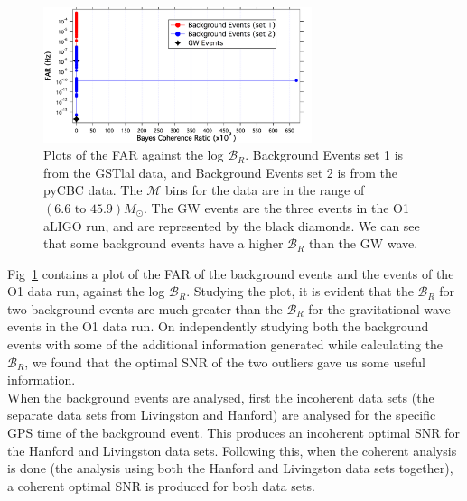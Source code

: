 \documentclass{article}
\begin{document}
 
 
 
 \begin{figure}[h]
 	\centering
 	\includegraphics[width=0.7\textwidth]{Figures/Outlier.png} 
 	\caption{Plots of the FAR against the log $\mathcal{B}_{R}$. Background Events set 1 is from the GSTlal data, and Background Events set 2 is from the pyCBC data.  The $\mathcal{M}$ bins for the data are in the range of $(6.6  \text{ to } 45.9) M_{\odot}$. The GW events are the three events in the O1 aLIGO run, and are represented by the black diamonds. We can see that some background events have a higher $\mathcal{B}_{R}$ than the GW wave. }
 	\label{Fig:outlier}
 \end{figure}
 
 
 Fig~\ref{Fig:outlier} contains a plot of the FAR of the background events and the events of the O1 data run, against the log  $\mathcal{B}_{R}$. Studying the plot, it is evident that the $\mathcal{B}_{R}$ for two background events are much greater than the $\mathcal{B}_{R}$ for the gravitational wave events in the O1 data run.  On independently studying both the background events with some of the additional information generated while calculating the $\mathcal{B}_{R}$, we found that the optimal SNR of the two outliers gave us some useful information.\\
 
 When the background events are analysed, first the incoherent data sets (the separate data sets from Livingston and Hanford) are analysed for the specific GPS time of the background event. This produces an incoherent optimal SNR for the Hanford and Livingston data sets. Following this, when the coherent analysis is done (the analysis using both the Hanford and Livingston data sets together), a coherent optimal SNR is produced for both data sets. \\
 
 
 
 
 
\end{document}
